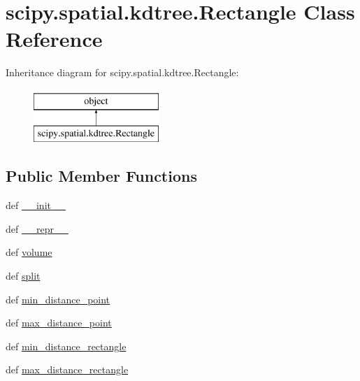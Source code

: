\hypertarget{classscipy_1_1spatial_1_1kdtree_1_1Rectangle}{}\section{scipy.\+spatial.\+kdtree.\+Rectangle Class Reference}
\label{classscipy_1_1spatial_1_1kdtree_1_1Rectangle}
Inheritance diagram for scipy.\+spatial.\+kdtree.\+Rectangle\+:\begin{figure}[H]
\begin{center}
\leavevmode
\includegraphics[height=2.000000cm]{classscipy_1_1spatial_1_1kdtree_1_1Rectangle}
\end{center}
\end{figure}
\subsection*{Public Member Functions}
\begin{DoxyCompactItemize}
\item 
def \hyperlink{classscipy_1_1spatial_1_1kdtree_1_1Rectangle_a2e320795856127dd05de8d8da5931310}{\+\_\+\+\_\+init\+\_\+\+\_\+}
\item 
def \hyperlink{classscipy_1_1spatial_1_1kdtree_1_1Rectangle_a46e366e6e1500862992f6fa345311598}{\+\_\+\+\_\+repr\+\_\+\+\_\+}
\item 
def \hyperlink{classscipy_1_1spatial_1_1kdtree_1_1Rectangle_af4c78716f2a987311cb4f0071006f433}{volume}
\item 
def \hyperlink{classscipy_1_1spatial_1_1kdtree_1_1Rectangle_adb2df8a5c8625851b291b5bcb95eb466}{split}
\item 
def \hyperlink{classscipy_1_1spatial_1_1kdtree_1_1Rectangle_ad67bbabe8b1d0f9678b8b248b8f66501}{min\+\_\+distance\+\_\+point}
\item 
def \hyperlink{classscipy_1_1spatial_1_1kdtree_1_1Rectangle_a93c9bc7574e8d51fd969def483aaeefe}{max\+\_\+distance\+\_\+point}
\item 
def \hyperlink{classscipy_1_1spatial_1_1kdtree_1_1Rectangle_a6186ce46edec6e4fccbf314a09f29687}{min\+\_\+distance\+\_\+rectangle}
\item 
def \hyperlink{classscipy_1_1spatial_1_1kdtree_1_1Rectangle_a69a9c038eb7cc686f8603d3b2da48a4c}{max\+\_\+distance\+\_\+rectangle}
\end{DoxyCompactItemize}
